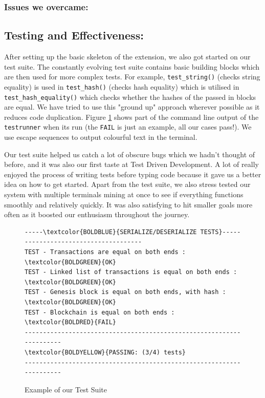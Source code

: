 \documentclass[a4paper]{article}
\begin{document}
\subsubsection{Issues we overcame: }
\lipsum[1-1]

\subsection{Testing and Effectiveness:}
After setting up the basic skeleton of the extension, we also got started on our test suite. The constantly evolving test suite contains basic building blocks which are then used for more complex tests. For example, \verb|test_string()| (checks string equality) is used in \verb|test_hash()| (checks hash equality) which is utilised in \verb|test_hash_equality()| which checks whether the hashes of the passed in blocks are equal. We have tried to use this "ground up" approach wherever possible as it reduces code duplication. Figure \ref{fig:test-example} shows part of the command line output of the \verb|testrunner| when its run (the \texttt{\textcolor{BOLDRED}{FAIL}} is just an example, all our cases pass!). We use escape sequences to output colourful text in the terminal.

Our test suite helped us catch a lot of obscure bugs which we hadn't thought of before, and it was also our first taste at Test Driven Development. A lot of really enjoyed the process of writing tests before typing code because it gave us a better idea on how to get started. Apart from the test suite, we also stress tested our system with multiple terminals mining at once to see if everything functions smoothly and relatively quickly. It was also satisfying to hit smaller goals more often as it boosted our enthusiasm throughout the journey.

\begin{figure}[htp]
\centering
\begin{BVerbatim}[commandchars=\\\{\}]
-----\textcolor{BOLDBLUE}{SERIALIZE/DESERIALIZE TESTS}-------------------------------------
TEST - Transactions are equal on both ends : \textcolor{BOLDGREEN}{OK}
TEST - Linked list of transactions is equal on both ends : \textcolor{BOLDGREEN}{OK}
TEST - Genesis block is equal on both ends, with hash : \textcolor{BOLDGREEN}{OK}
TEST - Blockchain is equal on both ends : \textcolor{BOLDRED}{FAIL}
---------------------------------------------------------------------
\textcolor{BOLDYELLOW}{PASSING: (3/4) tests}
---------------------------------------------------------------------
\end{BVerbatim}
\caption{Example of our Test Suite}
\label{fig:test-example}
\end{figure}
\end{document}
